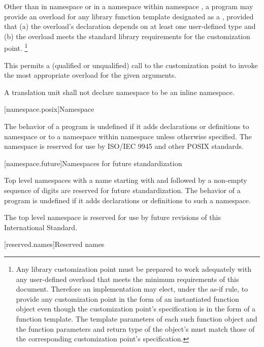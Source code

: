 \pnum
Other than in namespace 
or in a namespace
within namespace ,
a program may provide
an overload for any library function template
designated as a ,
provided that
(a)
the overload's declaration depends
on at least one user-defined type
and
(b)
the overload meets the standard library requirements
for the customization point.%
\footnote{
Any library customization point
must be prepared
to work adequately
with any user-defined overload
that meets the minimum requirements
of this document.
Therefore
an implementation may elect,
under the as-if rule,
to provide any customization point
in the form
of an instantiated function object
even though the customization point's specification
is in the form
of a function template.
The template parameters
of each such function object
and the function parameters
and return type
of the object's 
must match those
of the corresponding customization point's specification.}
\begin{note}
This permits
a (qualified or unqualified) call
to the customization point
to invoke the most appropriate overload
for the given arguments.
\end{note}

\pnum
A translation unit shall not declare namespace  to be an inline namespace.

[namespace.posix]{Namespace }

\pnum
The behavior of a \Cpp{} program is undefined if it adds declarations or definitions to namespace
or to a namespace within namespace
unless otherwise specified. The namespace  is reserved for use by
ISO/IEC 9945 and other POSIX standards.

[namespace.future]{Namespaces for future standardization}

\pnum
Top level namespaces with a name starting with  and
followed by a non-empty sequence of digits
are reserved for future standardization.
The behavior of a \Cpp{} program is undefined if
it adds declarations or definitions to such a namespace.
\begin{example}
The top level namespace  is reserved
for use by future revisions of this International Standard. \end{example}

[reserved.names]{Reserved names}%

